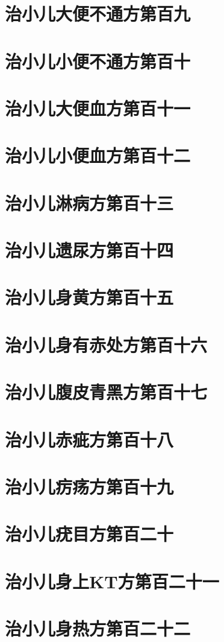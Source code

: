 \documentclass[a4paper,12pt,UTF8,twoside]{ctexbook}
\begin{document}
\chapter{治小儿大便不通方第百九}
\chapter{治小儿小便不通方第百十}
\chapter{治小儿大便血方第百十一}
\chapter{治小儿小便血方第百十二}
\chapter{治小儿淋病方第百十三}
\chapter{治小儿遗尿方第百十四}
\chapter{治小儿身黄方第百十五}
\chapter{治小儿身有赤处方第百十六}
\chapter{治小儿腹皮青黑方第百十七}
\chapter{治小儿赤疵方第百十八}
\chapter{治小儿疠疡方第百十九}
\chapter{治小儿疣目方第百二十}
\chapter{治小儿身上KT方第百二十一}
\chapter{治小儿身热方第百二十二}
\end{document}
